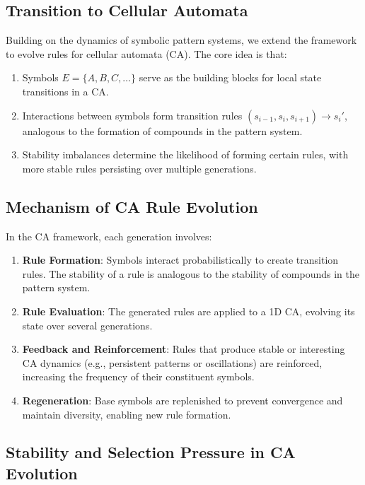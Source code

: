 \documentclass[entropy,article,submit,pdftex,moreauthors]{Definitions/mdpi}
\begin{document}
\subsection{Transition to Cellular Automata}

Building on the dynamics of symbolic pattern systems, we extend the framework to evolve rules for cellular automata (CA). The core idea is that:
\begin{enumerate}
    \item Symbols \( E = \{A, B, C, \ldots\} \) serve as the building blocks for local state transitions in a CA.
    \item Interactions between symbols form transition rules \( (s_{i-1}, s_i, s_{i+1}) \rightarrow s_i' \), analogous to the formation of compounds in the pattern system.
    \item Stability imbalances determine the likelihood of forming certain rules, with more stable rules persisting over multiple generations.
\end{enumerate}

\subsection{Mechanism of CA Rule Evolution}

In the CA framework, each generation involves:
\begin{enumerate}
    \item \textbf{Rule Formation}: Symbols interact probabilistically to create transition rules. The stability of a rule is analogous to the stability of compounds in the pattern system.
    \item \textbf{Rule Evaluation}: The generated rules are applied to a 1D CA, evolving its state over several generations.
    \item \textbf{Feedback and Reinforcement}: Rules that produce stable or interesting CA dynamics (e.g., persistent patterns or oscillations) are reinforced, increasing the frequency of their constituent symbols.
    \item \textbf{Regeneration}: Base symbols are replenished to prevent convergence and maintain diversity, enabling new rule formation.
\end{enumerate}

\subsection{Stability and Selection Pressure in CA Evolution}
\end{document}

